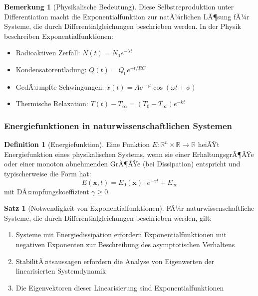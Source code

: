 ﻿\documentclass[a4paper,12pt]{scrreprt}
\theoremstyle{definition}
\newtheorem{definition}{Definition}[section]
\newtheorem{bemerkung}{Bemerkung}[section]
\newtheorem{satz}{Satz}[section]
\begin{document}
\begin{bemerkung}[Physikalische Bedeutung]
	Diese Selbstreproduktion unter Differentiation macht die Exponentialfunktion zur natÃ¼rlichen LÃ¶sung fÃ¼r Systeme, die durch Differentialgleichungen beschrieben werden. In der Physik beschreiben Exponentialfunktionen:
	\begin{itemize}
		\item[-] Radioaktiven Zerfall: $N(t) = N_0 e^{-\lambda t}$
		\item[-] Kondensatorentladung: $Q(t) = Q_0 e^{-t/RC}$
		\item[-] GedÃ¤mpfte Schwingungen: $x(t) = A e^{-\gamma t} \cos(\omega t + \phi)$
		\item[-] Thermische Relaxation: $T(t) - T_{\infty} = (T_0 - T_{\infty}) e^{-kt}$
	\end{itemize}
\end{bemerkung}

\subsubsection{Energiefunktionen in naturwissenschaftlichen Systemen}

\begin{definition}[Energiefunktion]
	Eine Funktion $E: \mathbb{R}^n \times \mathbb{R} \to \mathbb{R}$ heiÃŸt Energiefunktion eines physikalischen Systems, wenn sie einer ErhaltungsgrÃ¶ÃŸe oder einer monoton abnehmenden GrÃ¶ÃŸe (bei Dissipation) entspricht und typischerweise die Form hat:
	\begin{equation}
		E(\mathbf{x}, t) = E_0(\mathbf{x}) \cdot e^{-\gamma t} + E_{\infty}
	\end{equation}
	mit DÃ¤mpfungskoeffizient $\gamma \geq 0$.
\end{definition}

\begin{satz}[Notwendigkeit von Exponentialfunktionen]
	FÃ¼r naturwissenschaftliche Systeme, die durch Differentialgleichungen beschrieben werden, gilt:
	\begin{enumerate}
		\item[-] Systeme mit Energiedissipation erfordern Exponentialfunktionen mit negativen Exponenten zur Beschreibung des asymptotischen Verhaltens
		\item[-] StabilitÃ¤tsaussagen erfordern die Analyse von Eigenwerten der linearisierten Systemdynamik
		\item[-] Die Eigenvektoren dieser Linearisierung sind Exponentialfunktionen
	\end{enumerate}
\end{satz}
\end{document}
